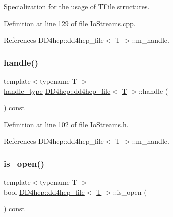 Specialization for the usage of T\+File structures. 



Definition at line 129 of file Io\+Streams.\+cpp.



References D\+D4hep\+::dd4hep\+\_\+file$<$ T $>$\+::m\+\_\+handle.

\hypertarget{class_d_d4hep_1_1dd4hep__file_af93150d3bdfa3b6ed9157ac158a18e95}{}\label{class_d_d4hep_1_1dd4hep__file_af93150d3bdfa3b6ed9157ac158a18e95} 
\subsubsection{\texorpdfstring{handle()}{handle()}}
{\footnotesize\ttfamily template$<$typename T $>$ \\
\hyperlink{class_d_d4hep_1_1dd4hep__file_a4d79f8d433cd7831ff818691424cd6fc}{handle\+\_\+type} \hyperlink{class_d_d4hep_1_1dd4hep__file}{D\+D4hep\+::dd4hep\+\_\+file}$<$ \hyperlink{class_t}{T} $>$\+::handle (\begin{DoxyParamCaption}{ }\end{DoxyParamCaption}) const\hspace{0.3cm}{\ttfamily [inline]}}



Definition at line 102 of file Io\+Streams.\+h.



References D\+D4hep\+::dd4hep\+\_\+file$<$ T $>$\+::m\+\_\+handle.

\hypertarget{class_d_d4hep_1_1dd4hep__file_a9fdd990cc635328ed3987f16cc0a07c1}{}\label{class_d_d4hep_1_1dd4hep__file_a9fdd990cc635328ed3987f16cc0a07c1} 
\subsubsection{\texorpdfstring{is\+\_\+open()}{is\_open()}}
{\footnotesize\ttfamily template$<$typename T $>$ \\
bool \hyperlink{class_d_d4hep_1_1dd4hep__file}{D\+D4hep\+::dd4hep\+\_\+file}$<$ \hyperlink{class_t}{T} $>$\+::is\+\_\+open (\begin{DoxyParamCaption}{ }\end{DoxyParamCaption}) const\hspace{0.3cm}{\ttfamily [inline]}}



